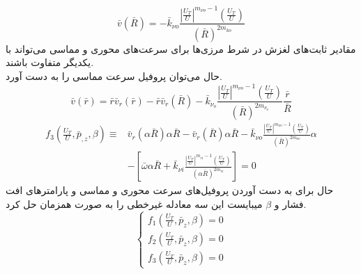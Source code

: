 \begin{equation}
	\label{nu_R}
	\bar{v}(\bar{R})=-\bar{k}_{\nu o} \frac{\left|\frac{U_{T}}{U}\right|^{m_{\nu o}-1}\left(\frac{U_{T}}{U}\right)}{(\bar{R})^{2 m_{k o}}}
\end{equation}
مقادیر ثابت‌های لغزش در شرط مرزی‌ها برای سرعت‌های محوری و مماسی می‌تواند با یکدیگر متفاوت باشند.
\\
حال می‌توان پروفیل سرعت مماسی را به دست آورد.
\begin{equation}
	\label{nu_profile}
	\bar{v}(\bar{r})=\bar{r} \bar{v}_{r}(\bar{r})-\bar{r} \bar{v}_{r}(\bar{R})-\bar{k}_{\nu_{o}} \frac{\left|\frac{U_{T}}{U}\right|^{m_{\nu o}-1}\left(\frac{U_{T}}{U}\right)}{(\bar{R})^{2 m_{\nu_{o}}}} \frac{\bar{r}}{\bar{R}}
\end{equation}
\begin{equation}
	\begin{aligned}
		f_{3}\left(\frac{U_{T}}{U}, \bar{p}_{, z}, \beta\right) \equiv & \bar{v}_{r}(\alpha \bar{R}) \alpha \bar{R}-\bar{v}_{r}(\bar{R}) \alpha \bar{R}-\bar{k}_{\nu o} \frac{\left|\frac{U_{T}}{U}\right|^{m_{\nu o}-1}\left(\frac{U_{T}}{U}\right)}{(\bar{R})^{2 m_{\nu o}}} \alpha \\
		&-\left[\bar{\omega} \alpha \bar{R}+\bar{k}_{\nu i} \frac{\left|\frac{U_{T}}{U}\right|^{m_{v i}-1}\left(\frac{U_{T}}{U}\right)}{(\alpha \bar{R})^{2 m_{v i}}}\right]=0
	\end{aligned}
\end{equation}
حال برای به دست آوردن پروفیل‌های سرعت محوری و مماسی و پارامتر‌های افت‌ فشار و $\beta$ میبایست این سه معادله غیرخطی را به صورت همزمان حل کرد.
\begin{equation}
	\left\{\begin{array}{l}
		f_{1}\left(\frac{U_{T}}{U}, \bar{p}_{z}, \beta\right)=0 \\
		f_{2}\left(\frac{U_{T}}{U}, \bar{p}_{z}, \beta\right)=0 \\
		f_{3}\left(\frac{U_{T}}{U}, \bar{p}_{z}, \beta\right)=0
	\end{array}\right.
\end{equation}
